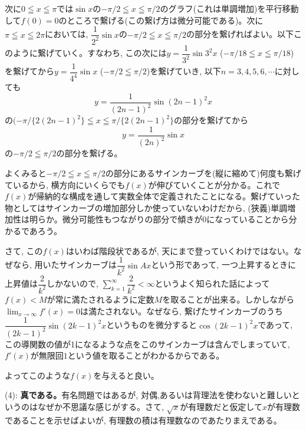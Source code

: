 \documentclass[twocolumn]{jbook}
\theoremstyle{definition}
\renewcommand{\leq}{\leqq}
\begin{document}
次に$0\leq x\leq \pi$では$\sin{x}$の$-\pi/2\leq x\leq \pi/2$のグラフ(これは単調増加)を平行移動して$f(0)=0$のところで繋げる(この繋げ方は微分可能である)。次に$\pi \leq x\leq 2\pi$においては, $\dfrac{1}{2^{2}}\sin{x}$の$-\pi/2\leq x\leq \pi/2$の部分を繋げればよい。以下このように繋げていく。すなわち, この次には$y=\dfrac{1}{3^{2}}\sin{3^2x}$ ($-\pi/18\leq x\leq\pi/18$)を繋げてから$y=\dfrac{1}{4^{4}}\sin{x}$ ($-\pi/2\leq \pi/2$)を繋げていき, 以下$n=3,4,5,6,\cdots$に対しても
\[y=\dfrac{1}{(2n-1)^2}\sin{(2n-1)^2x}\]
の$(-\pi/\{2(2n-1)^2\}\leq x\leq \pi/\{2(2n-1)^2\}$の部分を繋げてから
\[y=\dfrac{1}{(2n)^2}\sin{x}\]
の$-\pi/2\leq\pi/2$の部分を繋げる。

よくみると$-\pi/2\leq x\leq \pi/2$の部分にあるサインカーブを(縦に縮めて)何度も繋げているから, 横方向にいくらでも$f(x)$が伸びていくことが分かる。これで$f(x)$が帰納的な構成を通して実数全体で定義されたことになる。繋げていった物としてはサインカーブの増加部分しか使っていないわけだから, (狭義)単調増加性は明らか。微分可能性もつながりの部分で傾きが$0$になっていることから分かるであろう。

さて, この$f(x)$はいわば階段状であるが, 天にまで登っていくわけではない。なぜなら, 用いたサインカーブは$\dfrac{1}{k^2}\sin{Ax}$という形であって, 一つ上昇するときに上昇値は$\dfrac{2}{k^2}$しかないので, $\sum_{k=1}^{\infty}\dfrac{2}{k^2}<\infty$というよく知られた話によって$f(x)<M$が常に満たされるように定数$M$を取ることが出来る。しかしながら$\lim_{x\to \infty} f'(x) = 0$は満たされない。なぜなら, 繋げたサインカーブのうち$\dfrac{1}{(2k-1)^2}\sin{(2k-1)^2x}$というものを微分すると$\cos{(2k-1)^2x}$であって, この導関数の値が1になるような点をこのサインカーブは含んでしまっていて, $f'(x)$が無限回$1$という値を取ることがわかるからである。

よってこのような$f(x)$を与えると良い。

(4): \textbf{真である。}有名問題ではあるが, 対偶,あるいは背理法を使わないと難しいというのはなぜか不思議な感じがする。さて, $\sqrt{x}$が有理数だと仮定して$x$が有理数であることを示せばよいが, 有理数の積は有理数なのであたりまえである。
\end{document}
